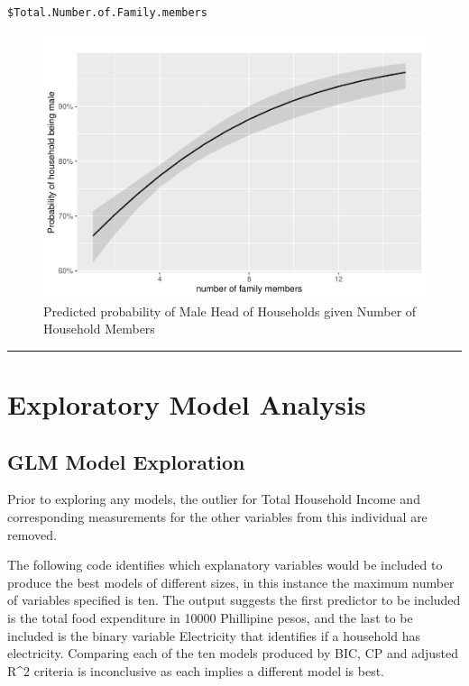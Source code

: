 \documentclass[
]{article}
\begin{document}
\begin{verbatim}
$Total.Number.of.Family.members
\end{verbatim}

\begin{figure}[H]

{\centering \includegraphics[width=0.8\linewidth]{Group_01_Project2_demo_files/figure-latex/probability plot 2-1} 

}

\caption{Predicted probability of Male Head of Households given Number of Household Members}\label{fig:probability plot 2}
\end{figure}

\begin{center}\rule{0.5\linewidth}{0.5pt}\end{center}

\newpage

\hypertarget{sec:EMA}{%
\section{Exploratory Model Analysis}\label{sec:EMA}}

\hypertarget{glm-model-exploration}{%
\subsection{GLM Model Exploration}\label{glm-model-exploration}}

Prior to exploring any models, the outlier for Total Household Income
and corresponding measurements for the other variables from this
individual are removed.

The following code identifies which explanatory variables would be
included to produce the best models of different sizes, in this instance
the maximum number of variables specified is ten. The output suggests
the first predictor to be included is the total food expenditure in
10000 Phillipine pesos, and the last to be included is the binary
variable Electricity that identifies if a household has electricity.
Comparing each of the ten models produced by BIC, CP and adjusted R\^{}2
criteria is inconclusive as each implies a different model is best.
\end{document}

